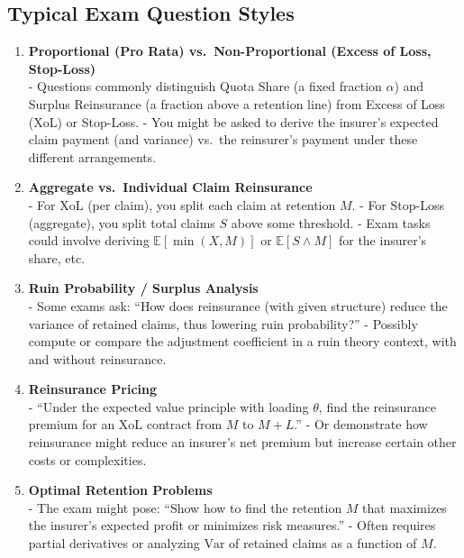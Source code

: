\documentclass[13pt,a4paper]{article}
\begin{document}
\subsection{Typical Exam Question Styles}
\begin{enumerate}
  \item \textbf{Proportional (Pro Rata) vs.\ Non-Proportional (Excess of Loss, Stop-Loss)}\\
    - Questions commonly distinguish Quota Share (a fixed fraction \(\alpha\)) and Surplus Reinsurance (a fraction above a retention line) from Excess of Loss (XoL) or Stop-Loss.  
    - You might be asked to derive the insurer’s expected claim payment (and variance) vs.\ the reinsurer’s payment under these different arrangements.

  \item \textbf{Aggregate vs.\ Individual Claim Reinsurance}\\
    - For XoL (per claim), you split each claim at retention \(M\).  
    - For Stop-Loss (aggregate), you split total claims \(S\) above some threshold.  
    - Exam tasks could involve deriving \(\mathbb{E}[\min(X,M)]\) or \(\mathbb{E}[S \wedge M]\) for the insurer’s share, etc.

  \item \textbf{Ruin Probability / Surplus Analysis}\\
    - Some exams ask: “How does reinsurance (with given structure) reduce the variance of retained claims, thus lowering ruin probability?”  
    - Possibly compute or compare the adjustment coefficient in a ruin theory context, with and without reinsurance.

  \item \textbf{Reinsurance Pricing}\\
    - “Under the expected value principle with loading \(\theta\), find the reinsurance premium for an XoL contract from \(M\) to \(M+L\).”  
    - Or demonstrate how reinsurance might reduce an insurer’s net premium but increase certain other costs or complexities.

  \item \textbf{Optimal Retention Problems}\\
    - The exam might pose: “Show how to find the retention \(M\) that maximizes the insurer’s expected profit or minimizes risk measures.”  
    - Often requires partial derivatives or analyzing \(\mathrm{Var}\) of retained claims as a function of \(M\).
\end{enumerate}
\end{document}
